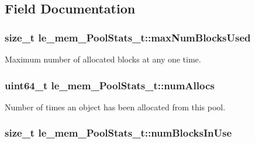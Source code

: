 \subsection{Field Documentation}
\subsubsection[{\texorpdfstring{max\+Num\+Blocks\+Used}{maxNumBlocksUsed}}]{\setlength{\rightskip}{0pt plus 5cm}size\+\_\+t le\+\_\+mem\+\_\+\+Pool\+Stats\+\_\+t\+::max\+Num\+Blocks\+Used}\hypertarget{structle__mem___pool_stats__t_ae0ecac2638936865038492db1e7d3d20}{}\label{structle__mem___pool_stats__t_ae0ecac2638936865038492db1e7d3d20}


Maximum number of allocated blocks at any one time. 

\subsubsection[{\texorpdfstring{num\+Allocs}{numAllocs}}]{\setlength{\rightskip}{0pt plus 5cm}uint64\+\_\+t le\+\_\+mem\+\_\+\+Pool\+Stats\+\_\+t\+::num\+Allocs}\hypertarget{structle__mem___pool_stats__t_abcfdbe19fa0d2deb6bc57858fc0c4512}{}\label{structle__mem___pool_stats__t_abcfdbe19fa0d2deb6bc57858fc0c4512}


Number of times an object has been allocated from this pool. 

\subsubsection[{\texorpdfstring{num\+Blocks\+In\+Use}{numBlocksInUse}}]{\setlength{\rightskip}{0pt plus 5cm}size\+\_\+t le\+\_\+mem\+\_\+\+Pool\+Stats\+\_\+t\+::num\+Blocks\+In\+Use}\hypertarget{structle__mem___pool_stats__t_a313be0351549e89c5137819f67b72e3b}{}\label{structle__mem___pool_stats__t_a313be0351549e89c5137819f67b72e3b}


